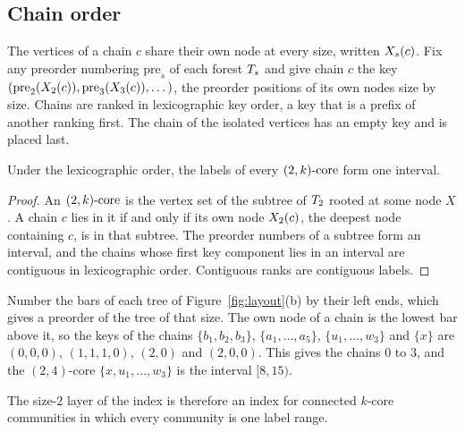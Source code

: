 \subsection{Chain order}\label{sec:order}
The vertices of a chain $c$ share their own node at every size, written $X_{s}(c)$.
%
Fix any preorder numbering $\mathrm{pre}_s$ of each forest $T_{s}$ and give chain $c$ the key $(\mathrm{pre}_2(X_{2}(c)),\mathrm{pre}_3(X_{3}(c)),\dots)$, the preorder positions of its own nodes size by size.
%
Chains are ranked in lexicographic key order, a key that is a prefix of another ranking first.
%
The chain of the isolated vertices has an empty key and is placed last.
\begin{theorem}\label{thm:onerange}
Under the lexicographic order, the labels of every $(2,k)\text{-core}$ form one interval.
\end{theorem}
\begin{proof}
An $(2,k)\text{-core}$ is the vertex set of the subtree of $T_{2}$ rooted at some node $X$.
%
A chain $c$ lies in it if and only if its own node $X_{2}(c)$, the deepest node containing $c$, is in that subtree.
%
The preorder numbers of a subtree form an interval, and the chains whose first key component lies in an interval are contiguous in lexicographic order.
%
Contiguous ranks are contiguous labels.
\end{proof}
\begin{example}\label{ex:order}
Number the bars of each tree of Figure~\ref{fig:layout}(b) by their left ends, which gives a preorder of the tree of that size.
%
The own node of a chain is the lowest bar above it, so the keys of the chains $\{b_1,b_2,b_3\}$, $\{a_1,\dots,a_5\}$, $\{u_1,\dots,w_3\}$ and $\{x\}$ are $(0,0,0)$, $(1,1,1,0)$, $(2,0)$ and $(2,0,0)$.
%
This gives the chains $0$ to $3$, and the $(2,4)$-core $\{x,u_1,\dots,w_3\}$ is the interval $[8,15)$.
\end{example}
The size-$2$ layer of the index is therefore an index for connected $k$-core communities in which every community is one label range.

